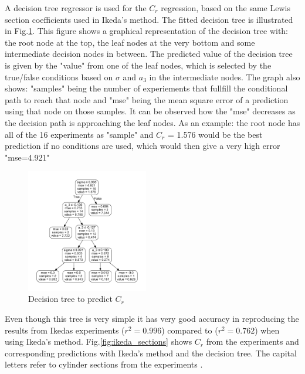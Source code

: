 A decision tree regressor is used for the $C_r$ regression, based on
the same Lewis section coefficients used in Ikeda's method. The fitted
decision tree is illustrated in Fig.\ref{fig:decision_tree}.
This figure shows a graphical representation of the decision tree with:
the root node at the top, the leaf nodes at the very bottom and some
intermediate decision nodes in between. The predicted value of the
decision tree is given by the "value" from one of the leaf nodes, which
is selected by the true/false conditions based on $\sigma$ and $a_3$
in the intermediate nodes. The graph also shows: "samples" being the
number of experiements that fullfill the conditional path to reach that
node and "mse" being the mean square error of a prediction using that
node on those samples. It can be observed how the "mse" decreases as the
decision path is approaching the leaf nodes. As an example: the root
node has all of the 16 experiments as "sample" and $C_r$ = 1.576 would
be the best prediction if no conditions are used, which would then give
a very high error "mse=4.921"
\begin{figure}[H]
\begin{center}\includegraphics[width = 0.475\textwidth]{figures/decision_tree.pdf}\end{center}
\vspace{-0.7cm}
\caption{Decision tree to predict $C_r$}
\label{fig:decision_tree}
\end{figure}
Even though this tree is very simple it has very good accuracy in
reproducing the results from Ikedas experiments ($r^2=0.996$) compared
to ($r^2=0.762$) when using Ikeda's method.
Fig.\ref{fig:ikeda_sections} shows $C_r$ from the experiments
and corresponding predictions with Ikeda's method and the decision tree.
The capital letters refer to cylinder sections from the experiments
\citep{7505983/4AFVVGNT}.
